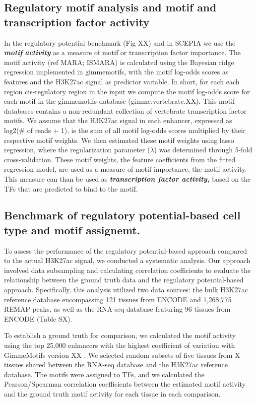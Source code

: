 \subsection{Regulatory motif analysis and motif and transcription factor activity}

In the regulatory potential benchmark (Fig XX) and in SCEPIA we use the \textbf{\textit{motif}} \textbf{\textit{activity}} as a measure of motif or transcription factor importance. The motif activity (ref MARA; ISMARA\cite{Balwierz2014}) is calculated using the Bayesian ridge regression implemented in gimmemotifs\cite{Bruse_2018}, with the motif log-odds scores as features and the H3K27ac signal as predictor variable. In short, for each each region cis-regulatory region in the input we compute the motif log-odds score for each motif in the gimmemotifs database (gimme.vertebrate.XX). This motif databases contains a non-redundant collection of vertebrate transcription factor motifs\cite{Bruse_2018}. We assume that the H3K27ac signal in each enhancer, expressed as log2(\# of reads + 1), is the sum of all motif log-odds scores multiplied by their respective motif weights. We then estimated these motif weights using lasso regression, where the regularization parameter ($\lambda$) was determined through 5-fold cross-validation. These motif weights, the feature coefficients from the fitted regression model, are used as a measure of motif importance, the motif activity. This measure can than be used as \textit{\textbf{transcription factor activity,}} based on the TFs that are predicted to bind to the motif.

\subsection{Benchmark of regulatory potential-based cell type and motif assignemt.}

To assess the performance of the regulatory potential-based approach compared to the actual H3K27ac signal, we conducted a systematic analysis. Our approach involved data subsampling and calculating correlation coefficients to evaluate the relationship between the ground truth data and the regulatory potential-based approach. Specifically, this analysis utilized two data sources: the bulk H3K27ac reference database encompassing 121 tissues from ENCODE and 1,268,775 REMAP peaks, as well as the RNA-seq database featuring 96 tissues from ENCODE (Table SX).

To establish a ground truth for comparison, we calculated the motif activity using the top 25,000 enhancers with the highest coefficient of variation with GimmeMotifs version XX \cite{Bruse_2018}. We selected random subsets of five tissues from X tissues shared between the RNA-seq database and the H3K27ac reference database.  The motifs were assigned to TFs, and we calculated the Pearson/Spearman correlation coefficients between the estimated motif activity and the ground truth motif activity for each tissue in each comparison.

